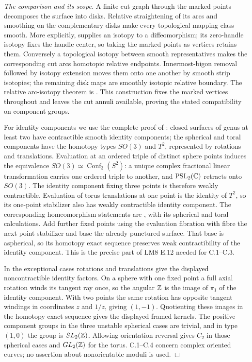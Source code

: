 \begin{proof}[The comparison and its scope]
A finite cut graph through the marked points decomposes the surface into disks. Relative straightening of its arcs and smoothing on the complementary disks make every topological mapping class smooth. More explicitly, \citet[Theorem B and the Handle Smoothing Theorem]{HatcherTorusTrick} supplies an isotopy to a diffeomorphism; its zero-handle isotopy fixes the handle center, so taking the marked points as vertices retains them. Conversely a topological isotopy between smooth representatives makes the corresponding cut arcs homotopic relative endpoints. Innermost-bigon removal followed by isotopy extension moves them onto one another by smooth strip isotopies; the remaining disk maps are smoothly isotopic relative boundary. The relative arc-isotopy theorem is \citet[Theorem 3.1 and Appendix]{Epstein1966}. This construction fixes the marked vertices throughout and leaves the cut annuli available, proving the stated compatibility on component groups.

For identity components we use the complete proof of
\citet[Appendix B, Theorem B.1]{HatcherMW2018}: closed surfaces of
genus at least two have contractible smooth identity components;
the spherical and toral components have the homotopy types $SO(3)$
and $T^2$, represented by rotations and translations. Evaluation
at an ordered triple of distinct sphere points induces the equivalence
$SO(3)\simeq\operatorname{Conf}_3(S^2)$: a unique complex fractional
linear transformation carries one ordered triple to another, and
$\operatorname{PSL}_2(\mathbb C)$ retracts onto $SO(3)$. The identity
component fixing three points is therefore weakly contractible.
Evaluation of torus translations at one point is the identity of
$T^2$, so its one-point stabilizer also has weakly contractible
identity component. The corresponding homeomorphism statements are
\citet[Theorems 1.5.1--1.5.2]{Hamstrom1974}, with its spherical and
toral calculations. Add further fixed points using the evaluation
fibration with fibre the next point stabilizer and base the already
punctured surface. That base is aspherical, so its homotopy exact
sequence preserves weak contractibility of the identity component.
This is the precise part of LM8 E.12 needed for C.1--C.3.

In the exceptional cases rotations and translations give the displayed noncontractible identity factors. On a sphere with one fixed point a full axial rotation winds its tangent ray once, so the angular $\mathbb Z$ is the image of $\pi_1$ of the identity component. With two points the same rotation has opposite tangent windings in coordinates $z$ and $1/z$, giving $(1,-1)$. Quotienting these images in the homotopy exact sequence gives the displayed framed kernels. The positive component groups in the three unstable spherical cases are trivial, and in type $(1,0)$ the group is $SL_2(\mathbb Z)$. Allowing orientation reversal gives $C_2$ in those spherical cases and $GL_2(\mathbb Z)$ for the torus. C.1--C.4 concern complex oriented curves; no assertion about nonorientable moduli is used.
\end{proof}

